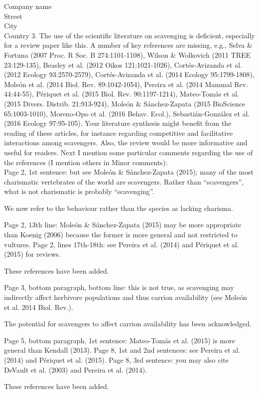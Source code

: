 \documentclass{letter}
\begin{document}
\begin{letter}{Company name \\ Street\\ City\\ Country}
3. The use of the scientific literature on scavenging is deficient, especially for a review paper like this. A number of key references are missing, e.g., Selva \& Fortuna (2007 Proc. R Soc. B 274:1101-1108), Wilson \& Wolkovich (2011 TREE 23:129-135), Beasley et al. (2012 Oikos 121:1021-1026), Cortés-Avizanda et al. (2012 Ecology 93:2570-2579), Cortés-Avizanda et al. (2014 Ecology 95:1799-1808), Moleón et al. (2014 Biol. Rev. 89:1042-1054), Pereira et al. (2014 Mammal Rev. 44:44-55), Périquet et al. (2015 Biol. Rev. 90:1197-1214), Mateo-Tomás et al. (2015 Divers. Distrib. 21:913-924), Moleón \& Sánchez-Zapata (2015 BioScience 65:1003-1010), Moreno-Opo et al. (2016 Behav. Ecol.), Sebastián-González et al. (2016 Ecology 97:95-105). Your literature synthesis might benefit from the reading of these articles, for instance regarding competitive and facilitative interactions among scavengers. Also, the review would be more informative and useful for readers. Next I mention some particular comments regarding the use of the references (I mention others in Minor comments): \\

Page 2, 1st sentence: but see Moleón \& Sánchez-Zapata (2015); many of the most charismatic vertebrates of the world are scavengers. Rather than “scavengers”, what is not charismatic is probably “scavenging”.

We now refer to the behaviour rather than the species as lacking charisma. 

 Page 2, 13th line: Moleón \& Sánchez-Zapata (2015) may be more appropriate than Koenig (2006) because the former is more general and not restricted to vultures.
 Page 2, lines 17th-18th: see Pereira et al. (2014) and Périquet et al. (2015) for reviews.

These references have been added. 

 Page 3, bottom paragraph, bottom line: this is not true, as scavenging may indirectly affect herbivore populations and thus carrion availability (see Moleón et al. 2014 Biol. Rev.).

The potential for scavengers to affect carrion availability has been acknowledged. 

 Page 5, bottom paragraph, 1st sentence: Mateo-Tomás et al. (2015) is more general than Kendall (2013).
 Page 8, 1st and 2nd sentences: see Pereira et al. (2014) and Périquet et al. (2015).
 Page 8, 3rd sentence: you may also cite DeVault et al. (2003) and Pereira et al. (2014).

These references have been added. 


\end{letter}
\end{document}
